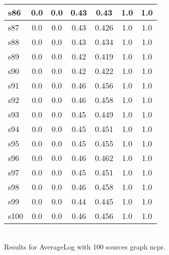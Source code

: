 \documentclass{article}
\begin{document}
\begin{tabular}{|l|c|c|c|c|c|c|}
\hline
s86 &0.0 & 0.0 & 0.43 & 0.43 & 1.0 & 1.0\\
\hline
s87 &0.0 & 0.0 & 0.43 & 0.426 & 1.0 & 1.0\\
\hline
s88 &0.0 & 0.0 & 0.43 & 0.434 & 1.0 & 1.0\\
\hline
s89 &0.0 & 0.0 & 0.42 & 0.419 & 1.0 & 1.0\\
\hline
s90 &0.0 & 0.0 & 0.42 & 0.422 & 1.0 & 1.0\\
\hline
s91 &0.0 & 0.0 & 0.46 & 0.456 & 1.0 & 1.0\\
\hline
s92 &0.0 & 0.0 & 0.46 & 0.458 & 1.0 & 1.0\\
\hline
s93 &0.0 & 0.0 & 0.45 & 0.449 & 1.0 & 1.0\\
\hline
s94 &0.0 & 0.0 & 0.45 & 0.451 & 1.0 & 1.0\\
\hline
s95 &0.0 & 0.0 & 0.45 & 0.455 & 1.0 & 1.0\\
\hline
s96 &0.0 & 0.0 & 0.46 & 0.462 & 1.0 & 1.0\\
\hline
s97 &0.0 & 0.0 & 0.45 & 0.451 & 1.0 & 1.0\\
\hline
s98 &0.0 & 0.0 & 0.46 & 0.458 & 1.0 & 1.0\\
\hline
s99 &0.0 & 0.0 & 0.44 & 0.445 & 1.0 & 1.0\\
\hline
s100 &0.0 & 0.0 & 0.46 & 0.456 & 1.0 & 1.0\\
\hline
\end{tabular}\\

\noindent Results for AverageLog with 100 sources graph ncpr.
\end{document}

